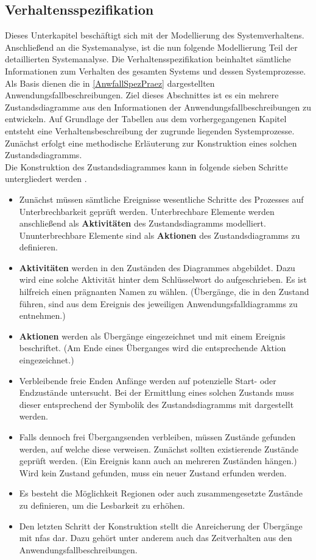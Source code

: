 \documentclass[../../../Bachelorarbeit.tex]{subfiles}
\begin{document}
\subsection{Verhaltensspezifikation}
Dieses Unterkapitel beschäftigt sich mit der Modellierung des Systemverhaltens. Anschließend an die Systemanalyse, ist die nun folgende Modellierung Teil der detaillierten Systemanalyse. Die Verhaltensspezifikation beinhaltet sämtliche Informationen zum Verhalten des gesamten Systems und dessen Systemprozesse. Als Basis dienen die in \autoref{AnwfallSpezPraez} dargestellten Anwendungsfallbeschreibungen. Ziel dieses Abschnittes ist es ein \bzw mehrere Zustandsdiagramme aus den Informationen der Anwendungsfallbeschreibungen zu entwickeln. Auf Grundlage der Tabellen aus dem vorhergegangenen Kapitel entsteht eine Verhaltensbeschreibung der zugrunde liegenden Systemprozesse. Zunächst erfolgt eine methodische Erläuterung zur Konstruktion eines solchen Zustandsdiagramms. \\
Die Konstruktion des Zustandsdiagrammes kann in folgende sieben Schritte untergliedert werden \cite[438]{Goll2011}.
\begin{itemize}
    \item Zunächst müssen sämtliche Ereignisse \bzw wesentliche Schritte des Prozesses auf Unterbrechbarkeit geprüft werden. Unterbrechbare Elemente werden anschließend als \textbf{Aktivitäten} des Zustandsdiagramms modelliert. Ununterbrechbare Elemente sind als \textbf{Aktionen} des Zustandsdiagramms zu definieren.
    \item \textbf{Aktivitäten} werden in den Zuständen des Diagrammes abgebildet. Dazu wird eine solche Aktivität hinter dem Schlüsselwort \glqq do\grqq{} aufgeschrieben. Es ist hilfreich einen prägnanten Namen zu wählen. (Übergänge, die in den Zustand führen, sind aus dem Ereignis des jeweiligen Anwendungsfalldiagramms zu entnehmen.)
    \item \textbf{Aktionen} werden als Übergänge eingezeichnet und mit einem Ereignis beschriftet. (Am Ende eines Überganges wird die entsprechende Aktion eingezeichnet.)
    \item Verbleibende freie Enden \bzw Anfänge werden auf potenzielle Start- oder Endzustände untersucht. Bei der Ermittlung eines solchen Zustands muss dieser entsprechend der Symbolik des Zustandsdiagramms mit dargestellt werden.
    \item Falls dennoch frei Übergangsenden verbleiben, müssen Zustände gefunden werden, auf welche diese verweisen. Zunächst sollten existierende Zustände geprüft werden. (Ein Ereignis kann auch an mehreren Zuständen hängen.) Wird kein Zustand gefunden, muss ein neuer Zustand erfunden werden.
    \item Es besteht die Möglichkeit Regionen oder auch zusammengesetzte Zustände zu definieren, um die Lesbarkeit zu erhöhen.
    \item Den letzten Schritt der Konstruktion stellt die Anreicherung der Übergänge mit \acp{nfa} dar. Dazu gehört unter anderem auch das Zeitverhalten aus den Anwendungsfallbeschreibungen. 
\end{itemize}
\end{document}
